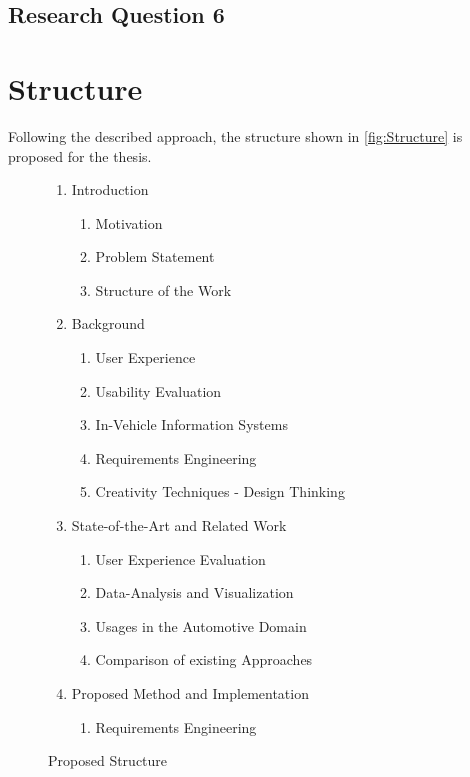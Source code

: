 \documentclass[10pt,a4paper]{scrartcl} %
\begin{document}
\subsection{Research Question 6}


\pagebreak
\section{Structure}
\label{sec:structure}
Following the described approach, the structure shown in \cref{fig:Structure} is proposed for the thesis.

\begin{figure}[h]
		\caption{Proposed Structure}
	\begin{enumerate}[label*=\arabic*.]
		\item Introduction
		\begin{enumerate}[label*=\arabic*]
			\item Motivation
			\item Problem Statement
			\item Structure of the Work
		\end{enumerate}
		\item Background
		\begin{enumerate}[label*=\arabic*]
			\item User Experience
			\item Usability Evaluation
			\item In-Vehicle Information Systems
			\item Requirements Engineering
			\item Creativity Techniques - Design Thinking
		\end{enumerate}
		\item State-of-the-Art and Related Work
		\begin{enumerate}[label*=\arabic*]
			\item User Experience Evaluation
			\item Data-Analysis and Visualization
			\item Usages in the Automotive Domain
			\item Comparison of existing Approaches
		\end{enumerate}
		\item Proposed Method and Implementation
		\begin{enumerate}[label*=\arabic*]
			\item Requirements Engineering

\end{enumerate}
\end{enumerate}
\end{figure}
\end{document}
